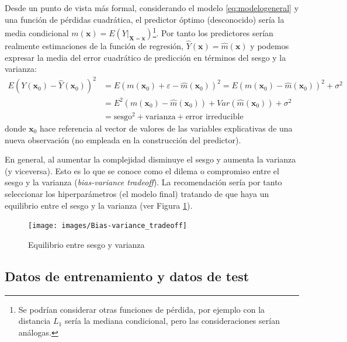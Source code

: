 \documentclass[
  spanish,
]{book}
\theoremstyle{break}
\theoremstyle{definition}
\theoremstyle{definition}
\theoremstyle{definition}
\theoremstyle{definition}
\theoremstyle{remark}
\begin{document}
Desde un punto de vista más formal, considerando el modelo \eqref{eq:modelogeneral} y una función de pérdidas cuadrática, el predictor óptimo (desconocido) sería la media condicional \(m(\mathbf{x}) = E\left( \left. Y\right\vert_{\mathbf{X}=\mathbf{x}} \right)\)\footnote{Se podrían considerar otras funciones de pérdida, por ejemplo con la distancia \(L_1\) sería la mediana condicional, pero las consideraciones serían análogas.}.
Por tanto los predictores serían realmente estimaciones de la función de regresión, \(\hat Y(\mathbf{x}) = \hat m(\mathbf{x})\) y podemos expresar la media del error cuadrático de predicción en términos del sesgo y la varianza:
\[
\begin{aligned}
E \left( Y(\mathbf{x}_0) - \hat Y(\mathbf{x}_0) \right)^2 & = E \left( m(\mathbf{x}_0) + \varepsilon - \hat m(\mathbf{x}_0) \right)^2 = E \left( m(\mathbf{x}_0) - \hat m(\mathbf{x}_0) \right)^2 + \sigma^2 \\
& = E^2 \left( m(\mathbf{x}_0) - \hat m(\mathbf{x}_0) \right) + Var\left( \hat m(\mathbf{x}_0) \right) + \sigma^2 \\
& = \text{sesgo}^2 + \text{varianza} + \text{error irreducible}
\end{aligned}
\]
donde \(\mathbf{x}_0\) hace referencia al vector de valores de las variables explicativas de una nueva observación (no empleada en la construcción del predictor).

En general, al aumentar la complejidad disminuye el sesgo y aumenta la varianza (y viceversa).
Esto es lo que se conoce como el dilema o compromiso entre el sesgo y la varianza (\emph{bias-variance tradeoff}).
La recomendación sería por tanto seleccionar los hiperparámetros (el modelo final) tratando de que haya un equilibrio entre el sesgo y la varianza (ver Figura \ref{fig:biasvar}).

\begin{figure}[!htb]

{\centering \texttt{[image: images/Bias-variance\_tradeoff]} 

}

\caption{Equilibrio entre sesgo y varianza}\label{fig:biasvar}
\end{figure}

\hypertarget{entrenamiento-test}{%
\subsection{Datos de entrenamiento y datos de test}\label{entrenamiento-test}}
\end{document}
